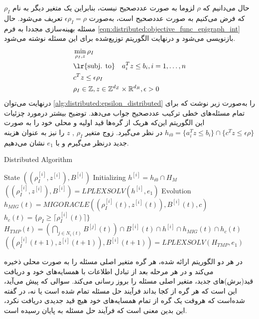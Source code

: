 	حال می‌دانیم که $\rho$ لزوما به صورت عددصحیح نیست، بنابراین یک متغیر دیگر به نام $\rho_I$ که فرض می‌کنیم به صورت عددصحیح است، به‌صورت $\epsilon\rho_I = \rho$ تعریف می‌شود. حال مسئله بهینه‌سازی مجددا به فرم \cref{eqn:distributed:objective_func_epigraph_int} بازنویسی می‌شود و درنهایت الگوریتم توزیع‌شده برای این مسئله نوشته می‌شود. 
	\begin{subequations}\label{eqn:distributed:objective_func_epigraph_int}
		\begin{align}
		&\min_{\rho_I,z}\rho_I \\
		&\text{\lr{subj. to}} \quad a_i^Tz \le b_i, i = 1, \dots, n  \\
		&c^Tz \le \epsilon \rho_I \\
		&\rho_I \in \mathbb{Z}, z \in \mathbb{Z}^{d_Z} \times \mathbb{R}^{d_R}, \epsilon > 0 \\
		\end{align}
	\end{subequations}
	درنهایت می‌توان \cref{alg:distributed:epsilon_distributed} را به‌صورت زیر نوشت که برای تمام مسئله‌های خطی ترکیب عددصحیح جواب می‌دهد. توضیح بیشتر درمورد چزئیات این الگوریتم این‌که هریک از گره‌ها قید اولیه و محلی خود را به صورت $h_{i0} = \{ a_i^Tz \le b_i\} \cap \{c^Tz \le \epsilon\rho\}$ در نظر می‌گیرد. زوج متغیر $\rho_I$ , $z$ را نیز به عنوان هزینه جدید درنظر می‌گیرم و با $e_1$ نشان می‌دهیم. 
\begin{latin}
	\begin{algorithm}
		\caption{Distributed Algorithm}
		\label{alg:distributed:epsilon_distributed}
		\begin{algorithmic}[1]
			\Statex State $((\rho_I^{[i]},z^{[i]}),B^{[i]})$
			\Statex Initializing    
			\State $h^{[i]} = h_{i0} \cap H_M$
			\State $((\rho_I^{[i]},z^{[i]}),B^{[i]}) = LPLEXSOLV(h^{[i]}, e_1)$
			\Statex Evolution 
			\State $h_{MIG}(t) = MIGORACLE((\rho_I^{[i]}(t),z^{[i]}(t)),B^{[i]}(t),c)$
			\State $h_c(t) = \{ \rho_I \ge \lceil\rho_I^{[i]}(t)\rceil \} $
			\State $\displaystyle H_{TMP}(t) = (\bigcap_{j \in N_i(t)}B^{[j]}(t)) \cap B^{[i]}(t) \cap h^{[i]} \cap h_{MIG}(t) \cap h_c(t)$
			\State $((\rho_I^{[i]}(t+1),z^{[i]}(t+1)),B^{[i]}(t+1)) = LPLEXSOLV(H_{TMP}, e_1)$
		\end{algorithmic}
	\end{algorithm}
\end{latin}

در هر دو الگوریتم ارائه شده، هر گره متغیر اصلی مسئله را به صورت محلی ذخیره می‌کند و در هر مرحله بعد از تبادل اطلاعات با همسایه‌های خود و دریافت قید(برش)های جدید، متغیر اصلی مسئله را بروز رسانی می‌کند. سوالی که پیش می‌آید، این است که هر گره از کجا بداند فرآیند حل مسئله تمام شده است یا نه، در \cite{testa2019distributed} گفته شده‌است که هروقت یک گره از تمام همسایه‌های خود هیچ قید جدیدی دریافت نکرد، این بدین معنی است که فرآیند حل مسئله به پایان رسیده است. 

